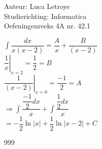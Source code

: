 \documentclass[a4paper]{article}
\begin{document}
  
\noindent \large Auteur: Luca Letroye \\
\noindent \large Studierichting: Informatica\\
\noindent \large Oefeningenreeks 4A nr. 42.1

\medskip
\normalsize

$\displaystyle\int \dfrac{dx}{x(x-2)} = \dfrac{A}{x} + \dfrac{B}{(x-2)}$\\

$\left. \dfrac{1}{x}\right|_{x=2}=\dfrac{1}{2} = B$\\

$\left. \dfrac{1}{(x-2)}\right|_{x=0}=\dfrac{-1}{2} = A$\\

$\Rightarrow \displaystyle\int \dfrac{\dfrac{-1}{2}dx}{x}+ \displaystyle\int \dfrac{\dfrac{1}{2}dx}{x}$\\

$= -\dfrac{1}{2}\ln|x| + \dfrac{1}{2}\ln|x-2| + C$\\







\begin{thebibliography}{999}
\end{thebibliography}
\end{document}
